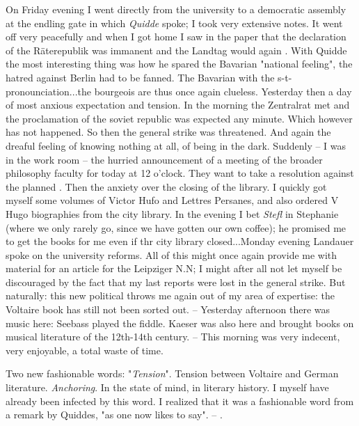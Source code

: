 
On Friday evening I went directly from the university to a democratic assembly at the endling gate in which \textit{Quidde} spoke; I took very extensive notes. It went off very peacefully and when I got home I saw in the paper that the declaration of the Räterepublik was immanent and the Landtag would again . With Quidde the most interesting thing was how he spared the Bavarian "national feeling", the hatred against Berlin had to be fanned. The Bavarian with the s-t-pronounciation...the bourgeois are thus once again clueless. Yesterday then a day of most anxious expectation and tension. In the morning the Zentralrat met and the proclamation of the soviet republic was expected any minute. Which however has not happened. So then the general strike was threatened. And again the dreaful feeling of knowing nothing at all, of being in the dark. Suddenly -- I was in the work room -- the hurried announcement of a meeting of the broader philosophy faculty for today at 12 o'clock. They want to take a resolution against the planned . Then the anxiety over the closing of the library. I quickly got myself some volumes of Victor Hufo and Lettres Persanes, and also ordered V Hugo biographies from the city library. In the evening I bet \textit{Stefl} in Stephanie (where we only rarely go, since we have gotten our own coffee); he promised me to get the books for me even if thr city library closed...Monday evening Landauer spoke on the university reforms. All of this might once again provide me with material for an article for the Leipziger N.N; I might after all not let myself be discouraged by the fact that my last reports were lost in the general strike. But naturally: this new political  throws me again out of my area of expertise: the Voltaire book has still not been sorted out. -- Yesterday afternoon there was music here: Seebass played the fiddle. Kaeser was also here and brought books on musical literature of the 12th-14th century. -- This morning was very indecent, very enjoyable, a total waste of time.

Two new fashionable words: "\textit{Tension}". Tension between Voltaire and German literature. \textit{Anchoring}. In the state of mind, in literary history. I myself have already been infected by this word. I realized that it was a fashionable word from a remark by Quiddes, "as one now likes to say". -- .

